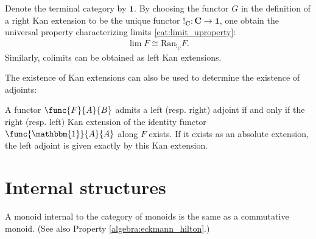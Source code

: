     \begin{example}[Limit]
        Denote the terminal category by $\mathbf{1}$. By choosing the functor $G$ in the definition of a right Kan extension to be the unique functor $!_{\mathbf{C}}:\mathbf{C}\rightarrow\mathbf{1}$, one obtain the universal property characterizing limits \ref{cat:limit_uproperty}:
        \begin{gather}
            \lim F\cong\mathrm{Ran}_{!_C}F.
        \end{gather}
        Similarly, colimits can be obtained as left Kan extensions.
    \end{example}

    The existence of Kan extensions can also be used to determine the existence of adjoints:
    \begin{property}
        A functor $\func{F}{A}{B}$ admits a left (resp. right) adjoint if and only if the right (resp. left) Kan extension of the identity functor $\func{\mathbbm{1}}{A}{A}$ along $F$ exists. If it exists as an absolute extension, the left adjoint is given exactly by this Kan extension.
    \end{property}


\section{Internal structures}

    \begin{property}\label{cat:eckmann_hilton}
        A monoid internal to the category of monoids is the same as a commutative monoid. (See also Property \ref{algebra:eckmann_hilton}.)
    \end{property}

